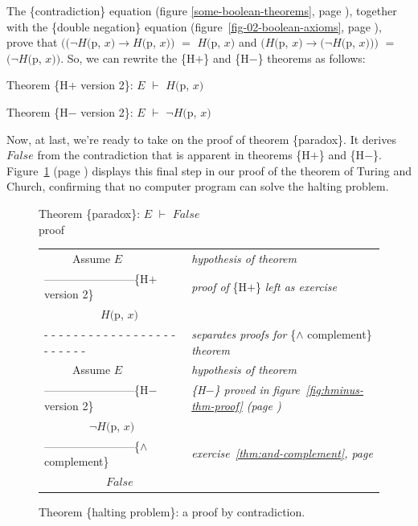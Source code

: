 The \{contradiction\} equation
(figure \ref{some-boolean-theorems}, page \pageref{some-boolean-theorems}),
together with the \{double negation\} equation
(figure~\ref{fig-02-boolean-axioms}, page \pageref{fig-02-boolean-axioms}),
prove that
$((\neg H($\textsf{p}, $x) \rightarrow H($\textsf{p}, $x))$ $=$ $H($\textsf{p}, $x)$
and
$(H($\textsf{p}, $x) \rightarrow (\neg H($\textsf{p}, $x)))$ $=$ $(\neg H($\textsf{p}, $x))$.
So, we can rewrite the \{H$+$\} and \{H$-$\} theorems as follows:

\label{thm:HplusHminus}\hspace*{2mm}Theorem \{H$+$ version 2\}: $E$ $\vdash$ $H($\textsf{p}, $x)$

\hspace*{2mm}Theorem \{H$-$ version 2\}: $E$ $\vdash$ $\neg H($\textsf{p}, $x)$
\vspace{2mm}

Now, at last, we're ready to take on
the proof of theorem \{paradox\}.
It derives $False$ from the contradiction that is apparent
in theorems \{H$+$\} and \{H$-$\}.
Figure~\ref{fig:proof-paradox-thm} (page \pageref{fig:proof-paradox-thm})
displays this final step in our proof
of the theorem of Turing and Church,
confirming that no computer program can solve the halting problem.

\begin{figure}
Theorem \{paradox\}: $E$ $\vdash$ $False$\\
proof
\begin{center}
\begin{tabular}{ll}
~~~~~Assume $E$                                 &\emph{hypothesis of theorem}\\
------------------------\{H$+$ version 2\}      &\emph{proof of} \{H$+$\} \emph{left as exercise}\\
~~~~~~~~~~$H($\textsf{p}, $x)$                  &\\
 - - - - - - - - - - - - - - - - - - - - - - - -&\emph{separates proofs for} \{$\wedge$ complement\} \emph{theorem}\\
~~~~~Assume $E$                                 &\emph{hypothesis of theorem}\\
------------------------\{H$-$ version 2\}      &\emph{\{H$-$\} proved in figure~\ref{fig:hminus-thm-proof} (page \pageref{fig:hminus-thm-proof})}\\
~~~~~~~~$\neg H($\textsf{p}, $x)$               &\\
------------------------\{$\wedge$ complement\} &\emph{exercise~\ref{thm:and-complement}, page \pageref{thm:and-complement}}\\
~~~~~~~~~~~$False$                              &\\
\end{tabular}
\end{center}
\caption{Theorem \{halting problem\}: a proof by contradiction.}
\label{fig:proof-paradox-thm}
\end{figure}

